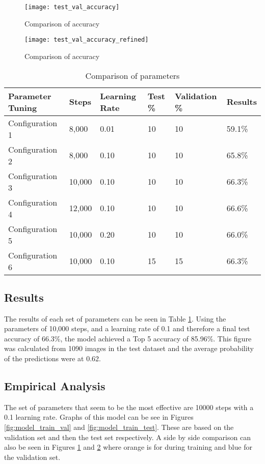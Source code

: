 \begin{figure}
    \texttt{[image: test\_val\_accuracy]}
     \caption{Comparison of accuracy}
     \label{fig:test_val_accuracy}
\end{figure}

\begin{figure}
    \texttt{[image: test\_val\_accuracy\_refined]}
     \caption{Comparison of accuracy}
     \label{fig:test_val_accuracy_refined}
\end{figure}


\begin{table}[]
	\centering
	\caption{Comparison of parameters}
	\label{parameter_tuning_table}
	\begin{tabular}{|l|l|l|l|l|l|}
  \hline
		\textbf{Parameter Tuning} & \textbf{Steps} & \textbf{Learning Rate} & \textbf{Test} \% & \textbf{Validation} \% &
		\textbf{Results} \\ \hline
		Configuration 1  & 8,000  & 0.01       & 10 & 10       &
		59.1\%  \\ \hline
		Configuration 2  & 8,000  & 0.10           & 10 & 10       &
		65.8\%  \\ \hline
		Configuration 3  & 10,000 & 0.10           & 10 & 10       &
		66.3\%  \\ \hline
		Configuration 4  & 12,000 & 0.10           & 10 & 10       &
		66.6\%  \\ \hline
		Configuration 5  & 10,000 & 0.20           & 10 & 10       &
		66.0\%  \\ \hline
		Configuration 6  & 10,000 & 0.10           & 15      & 15            &
		66.3\%  \\ \hline
	\end{tabular}
\end{table}

\subsection*{Results}
The results of each set of parameters can be seen in Table
\ref{parameter_tuning_table}.
Using the parameters of 10,000 steps, and a learning rate of 0.1 and therefore a final test accuracy of 66.3\%, the model achieved a Top 5 accuracy of 85.96\%.
This figure was calculated from 1090 images in the test dataset and the average probability of the predictions were at 0.62.


\subsection*{Empirical Analysis}
The set of parameters that seem to be the most
effective are 10000 steps with a 0.1 learning rate. Graphs of this model can be
see in Figures \ref{fig:model_train_val} and \ref{fig:model_train_test}. These
are based on the validation set and then the test set respectively. A side by
side comparison can also be seen in Figures \ref{fig:test_val_accuracy} and
\ref{fig:test_val_accuracy_refined} where orange is for during training and blue
for the validation set.

